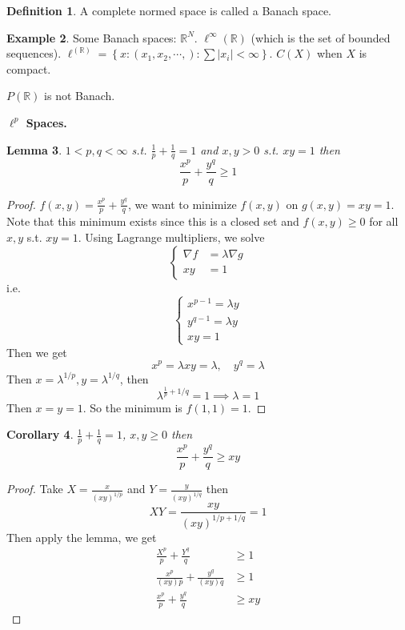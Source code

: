 \documentclass[11pt,a4paper]{article}
\theoremstyle{definition}
\newtheorem{definition}{Definition}[section]
\newtheorem{example}[definition]{Example}
\theoremstyle{plain}
\newtheorem{lemma}[definition]{Lemma}
\newtheorem{corollary}[definition]{Corollary}
\theoremstyle{remark}
\newcommand{\R}{\mathbb{R}}
\renewcommand{\set}[1]{\left\{ #1 \right\}}
\newcommand{\abs}[1]{\lvert #1 \rvert}
\newcommand{\1}{\mathbbm{1}}
\begin{document}
\begin{definition}
    A complete normed space is called a Banach space.
\end{definition}

\begin{example}
    Some Banach spaces: $\R^N$.
    $\ell^\infty(\R)$ (which is the set of bounded sequences). 
    $\ell^(\R) = \set{x \colon (x_1, x_2, \cdots,) \colon \sum \abs{x_i} < \infty}$. 
    $C(X)$ when $X$ is compact.

    $P(\R)$ is not Banach.
\end{example}

\textbf{$\ell^p$ Spaces.} 

\begin{lemma}
    $1 < p,q < \infty$ s.t. $\frac{1}{p}+ \frac{1}{q} = 1$ and $x,y > 0$ s.t. $xy = 1$ then 
    $$\frac{x^p}{p} + \frac{y^q}{q} \ge 1$$
\end{lemma}

\begin{proof}
    $f(x,y) = \frac{x^p}{p} + \frac{y^q}{q}$, we want to minimize $f(x,y)$ on $g(x,y) = xy = 1$. Note that this minimum exists since this is a closed set and $f(x,y) \ge 0$ 
    for all $x, y$ s.t. $xy = 1$. Using Lagrange multipliers, we solve 
    $$
    \begin{cases}
        \nabla f &= \lambda \nabla g \\
        xy &= 1
        \end{cases}
    $$
    i.e.
    $$\begin{cases}
            x^{p-1} = \lambda y \\
            y^{q-1} = \lambda y \\
            xy = 1
        \end{cases}
    $$
    Then we get 
    $$x^p = \lambda xy = \lambda, \quad y^q = \lambda$$
    Then $x = \lambda^{1/p}, y = \lambda^{1/q}$, then 
    $$\lambda^{\frac{1}{p} + 1/q} = 1 \implies \lambda = 1$$
    Then $x = y = 1$. So the minimum is $f(1,1 ) = 1$.
\end{proof}

\begin{corollary}
    $\frac{1}{p} + \frac{1}{q} = 1$, $x,y \ge 0$ then 
    $$\frac{x^p}{p} + \frac{y^q}{q} \ge xy$$
\end{corollary}

\begin{proof}
    Take $X = \frac{x}{(xy)^{1/p}}$ and $Y = \frac{y}{(xy)^{1/q}}$ then 
    $$XY = \frac{xy}{(xy)^{1/p + 1/q}} = 1$$
    Then apply the lemma, we get 
    \begin{align*}
        \frac{X^p}{p} + \frac{Y^q}{q} &\ge 1 \\
        \frac{x^p}{(xy)p} + \frac{y^q}{(xy)q} &\ge 1\\
        \frac{x^p}{p} + \frac{y^q}{q} &\ge xy  
    \end{align*}
\end{proof}
\end{document}
